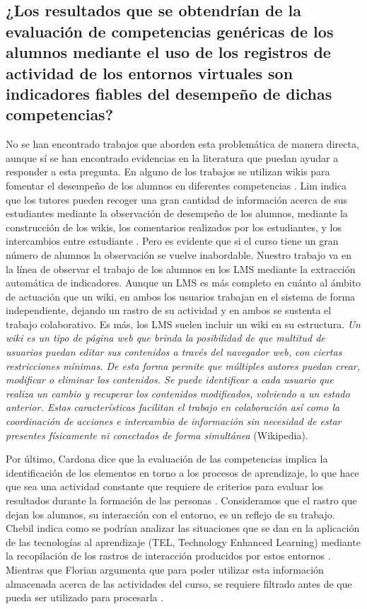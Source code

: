 \subsection{¿Los resultados que se obtendrían de la evaluación de competencias genéricas de los alumnos mediante el uso de los registros de actividad de los entornos virtuales son indicadores fiables del desempeño de dichas competencias?}

No se han encontrado trabajos que aborden esta problemática de manera directa, aunque sí se han encontrado evidencias en la literatura que puedan ayudar a responder a esta pregunta. En alguno de los trabajos se utilizan wikis para fomentar el desempeño de los alumnos en diferentes competencias \cite{Piedra:2010}. Lim indica que los tutores pueden recoger una gran cantidad de información acerca de sus estudiantes mediante la observación de desempeño de los alumnos, mediante la construcción de los wikis, los comentarios realizados por los estudiantes, y los intercambios entre estudiante \cite{Lim:2011}. Pero es evidente que si el curso tiene un gran número de alumnos la observación se vuelve inabordable. Nuestro trabajo va en la línea de observar el trabajo de los alumnos en los LMS mediante la extracción automática de indicadores. Aunque un LMS es más completo en cuánto al ámbito de actuación que un wiki, en ambos los usuarios trabajan en el sistema de forma independiente, dejando un rastro de su actividad y en ambos se sustenta el trabajo colaborativo. Es más, los LMS suelen incluir un wiki en su estructura. \emph{Un wiki es un tipo de página web que brinda la posibilidad de que multitud de usuarios puedan editar sus contenidos a través del navegador web, con ciertas restricciones mínimas. De esta forma permite que múltiples autores puedan crear, modificar o eliminar los contenidos. Se puede identificar a cada usuario que realiza un cambio y recuperar los contenidos modificados, volviendo a un estado anterior. Estas características facilitan el trabajo en colaboración así como la coordinación de acciones e intercambio de información sin necesidad de estar presentes físicamente ni conectados de forma simultánea} (Wikipedia). 

Por último, Cardona dice que la evaluación de las competencias implica la identificación de los elementos en torno a los procesos de aprendizaje, lo que hace que sea una actividad constante que requiere de criterios para evaluar los resultados durante la formación de las personas \cite{Cardona:2013}. Consideramos que el rastro que dejan los alumnos, su interacción con el entorno, es un reflejo de su trabajo. Chebil indica como se podrían analizar las situaciones que se dan en la aplicación de las tecnologías al aprendizaje (TEL, Technology Enhanced Learning) mediante la recopilación de los rastros de interacción producidos por estos entornos \cite{Chebil:2012}. Mientras que Florian argumenta que para poder utilizar esta información almacenada acerca de las actividades del curso, se requiere filtrado antes de que pueda ser utilizado para procesarla \cite{Florian:2011}.


